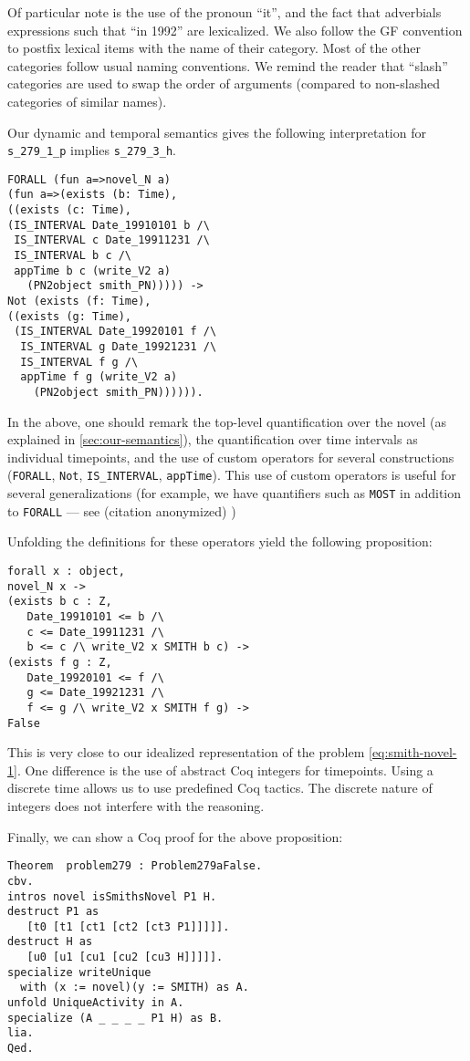 \documentclass[a4paper,11pt]{article}
\begin{document}
Of particular note is the use of the pronoun ``it'', and the fact that
adverbials expressions such that ``in 1992'' are lexicalized.  We also
follow the GF convention to postfix lexical items with the name of
their category. Most of the other categories follow usual naming
conventions. We remind the reader that ``slash'' categories are used
to swap the order of arguments (compared to non-slashed categories of
similar names).

Our dynamic and temporal semantics gives the following interpretation
for \verb!s_279_1_p! implies \verb!s_279_3_h!.
{\small
\begin{verbatim}
FORALL (fun a=>novel_N a)
(fun a=>(exists (b: Time),
((exists (c: Time),
(IS_INTERVAL Date_19910101 b /\
 IS_INTERVAL c Date_19911231 /\
 IS_INTERVAL b c /\
 appTime b c (write_V2 a)
   (PN2object smith_PN))))) ->
Not (exists (f: Time),
((exists (g: Time),
 (IS_INTERVAL Date_19920101 f /\
  IS_INTERVAL g Date_19921231 /\
  IS_INTERVAL f g /\
  appTime f g (write_V2 a) 
    (PN2object smith_PN)))))).
\end{verbatim}
}
In the above, one should remark the top-level quantification over the
novel (as explained in \cref{sec:our-semantics}), the quantification
over time intervals as individual timepoints, and the use of custom
operators for several constructions (\verb!FORALL!, \verb!Not!, \verb!IS_INTERVAL!,
\verb!appTime!). This use of custom operators is useful for several
generalizations (for example, we have quantifiers such as \verb!MOST! in
addition to \verb!FORALL! --- see \ifanon (citation anonymized)
\else \citet{bernardy_type-theoretical_2017} \fi)

Unfolding the definitions for these operators yield the following
proposition:
{\small
\begin{verbatim}
forall x : object,
novel_N x ->
(exists b c : Z,
   Date_19910101 <= b /\
   c <= Date_19911231 /\
   b <= c /\ write_V2 x SMITH b c) ->
(exists f g : Z,
   Date_19920101 <= f /\
   g <= Date_19921231 /\
   f <= g /\ write_V2 x SMITH f g) ->
False
\end{verbatim}
}This is very close to our idealized representation of the problem
\cref{eq:smith-novel-1}. One difference is the use of abstract Coq
integers for timepoints. Using a discrete time allows us to use
predefined Coq tactics. The discrete nature of integers does not
interfere with the reasoning.

Finally, we can show a Coq proof for the above proposition:
{\small
\begin{verbatim}
Theorem  problem279 : Problem279aFalse.
cbv.
intros novel isSmithsNovel P1 H.
destruct P1 as
   [t0 [t1 [ct1 [ct2 [ct3 P1]]]]].
destruct H as
   [u0 [u1 [cu1 [cu2 [cu3 H]]]]].
specialize writeUnique
  with (x := novel)(y := SMITH) as A.
unfold UniqueActivity in A.
specialize (A _ _ _ _ P1 H) as B.
lia.
Qed.
\end{verbatim}
}
\end{document}
